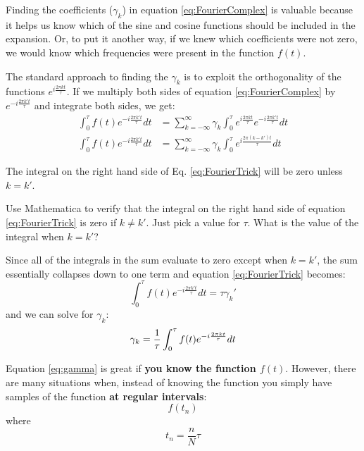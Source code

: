 Finding the coefficients ($\gamma_k$) in equation
\ref{eq:FourierComplex} is valuable because it helps us know which of
the sine and cosine functions should be included in the expansion.
Or, to put it another way, if we knew which coefficients were not
zero, we would know which frequencies were present in the function
$f(t)$.  

The standard approach to finding the $\gamma_k$ is to exploit the
orthogonality of the functions $e^{i \frac{2 \pi k t}{\tau}}$.  If we
multiply both sides of equation \ref{eq:FourierComplex} by $e^{-i
  \frac{2 \pi k' t}{\tau}}$ and integrate both sides, we get:
\begin{align}
\int_0^\tau f(t) e^{-i
  \frac{2 \pi k' t}{\tau}}dt &= \sum_{k=-\infty}^{\infty} \gamma_k
\int_0^\tau e^{i \frac{2 \pi k t}{\tau}}e^{-i
  \frac{2 \pi k' t}{\tau}} dt\\
\int_0^\tau f(t) e^{-i
  \frac{2 \pi k' t}{\tau}}dt &= \sum_{k=-\infty}^{\infty} \gamma_k
\int_0^\tau e^{i \frac{2 \pi (k-k') t}{\tau}} dt \label{eq:FourierTrick}
\end{align}

The integral on the right hand side of Eq. \ref{eq:FourierTrick} will
be zero unless $k = k'$.

\begin{enumerate}
\probtwo Use Mathematica to verify that the integral on the right hand
side of equation \ref{eq:FourierTrick} is zero if $k \ne k'$.  Just
pick a value for $\tau$.  What is the value of the integral when $k = k'$?
\end{enumerate}

Since all of the integrals in the sum evaluate to zero except when $k
= k'$, the sum essentially collapses down to one term and equation
\ref{eq:FourierTrick} becomes:
\begin{equation}
\int_0^\tau f(t) e^{-i
  \frac{2 \pi k' t}{\tau}}dt = \tau \gamma_k'
\end{equation}
 and we can solve for $\gamma_k$:
\begin{equation}\label{eq:gamma}
\gamma_k = {1 \over \tau} \int_0^\tau f(t) e^{-i
  \frac{2 \pi k t}{\tau}}dt 
\end{equation}


Equation \ref{eq:gamma} is great if \textbf{you know the function
  $f(t)$}.  However, there are many situations when, instead of knowing
the function you simply have samples of the function \textbf{at regular intervals}:
\[f(t_n) \]
where 
\[t_n = \frac{n}{N} \tau\]

